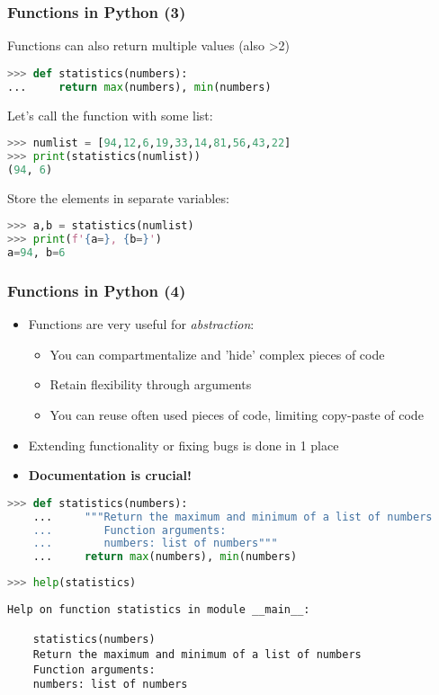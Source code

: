 \begin{frame}[fragile]
  \frametitle{Functions in Python (3)}
  Functions can also return multiple values (also >2)
  \begin{lstlisting}[language=Python, numbers=none]
>>> def statistics(numbers):
...     return max(numbers), min(numbers)
  \end{lstlisting}\pause
  Let's call the function with some list:
  \begin{lstlisting}[language=Python, numbers=none]
>>> numlist = [94,12,6,19,33,14,81,56,43,22]
>>> print(statistics(numlist))
(94, 6)
  \end{lstlisting}\pause
  Store the elements in separate variables:
  \begin{lstlisting}[language=Python, numbers=none]
>>> a,b = statistics(numlist)
>>> print(f'{a=}, {b=}')
a=94, b=6
  \end{lstlisting}\pause
\end{frame}

{\nologo
\begin{frame}[fragile]
  \frametitle{Functions in Python (4)}
  \begin{itemize}
    \item Functions are very useful for \emph{abstraction}:
    \begin{itemize}
      \item You can compartmentalize and 'hide' complex pieces of code\
      \item Retain flexibility through arguments
      \item You can reuse often used pieces of code, limiting copy-paste of code
    \end{itemize}
    \item Extending functionality or fixing bugs is done in 1 place\pause
    \item \bfseries{Documentation is crucial!}\pause
  \end{itemize}
  \begin{lstlisting}[language=Python, numbers=none]
    >>> def statistics(numbers):
    ...     """Return the maximum and minimum of a list of numbers
    ...        Function arguments:
    ...        numbers: list of numbers"""
    ...     return max(numbers), min(numbers)
  \end{lstlisting}\pause
  \begin{lstlisting}[language=Python, numbers=none]
    >>> help(statistics)
  \end{lstlisting}
  \begin{lstlisting}[style=PyOutput,keywords={statistics},keywordstyle=\bfseries]
    Help on function statistics in module __main__:
    
    statistics(numbers)
    Return the maximum and minimum of a list of numbers
    Function arguments:
    numbers: list of numbers
  \end{lstlisting}
\end{frame}
}
  
